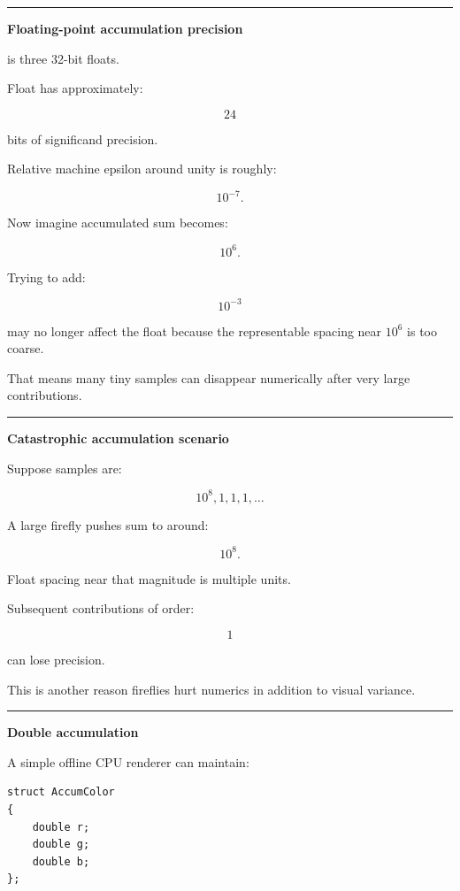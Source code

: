 \begin{center}\rule{0.5\linewidth}{0.5pt}\end{center}

\textbf{Floating-point accumulation precision}

 is three 32-bit floats.

Float has approximately:

\[
24
\]

bits of significand precision.

Relative machine epsilon around unity is roughly:

\[
10^{-7}.
\]

Now imagine accumulated sum becomes:

\[
10^6.
\]

Trying to add:

\[
10^{-3}
\]

may no longer affect the float because the representable spacing near \(10^6\) is too coarse.

That means many tiny samples can disappear numerically after very large contributions.

\begin{center}\rule{0.5\linewidth}{0.5pt}\end{center}

\textbf{Catastrophic accumulation scenario}

Suppose samples are:

\[
10^8,
1,
1,
1,
\dots
\]

A large firefly pushes sum to around:

\[
10^8.
\]

Float spacing near that magnitude is multiple units.

Subsequent contributions of order:

\[
1
\]

can lose precision.

This is another reason fireflies hurt numerics in addition to visual variance.

\begin{center}\rule{0.5\linewidth}{0.5pt}\end{center}

\textbf{Double accumulation}

A simple offline CPU renderer can maintain:

\begin{verbatim}
struct AccumColor
{
    double r;
    double g;
    double b;
};
\end{verbatim}

